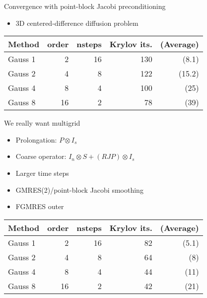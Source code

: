 \documentclass{beamer}
\begin{document}
\begin{frame}{Convergence with point-block Jacobi preconditioning}
  \begin{itemize}
  \item 3D centered-difference diffusion problem
  \end{itemize}
  \begin{tabular}{lrrrr}
    \toprule
    Method & order & nsteps & Krylov its. & (Average) \\
    \midrule
    Gauss 1 & 2 & 16 & 130 & (8.1) \\
    Gauss 2 & 4 & 8 & 122 & (15.2) \\
    Gauss 4 & 8 & 4 & 100 & (25) \\
    Gauss 8 & 16 & 2 & 78 & (39) \\
    \bottomrule
  \end{tabular}
\end{frame}

\begin{frame}{We really want multigrid}
  \begin{itemize}
  \item Prolongation: $P \otimes I_s$
  \item Coarse operator: $I_n \otimes S + (R J P) \otimes I_s$
  \item Larger time steps
  \item GMRES(2)/point-block Jacobi smoothing
  \item FGMRES outer
  \end{itemize}
  \begin{tabular}{lrrrr}
    \toprule
    Method & order & nsteps & Krylov its. & (Average) \\
    \midrule
    Gauss 1 & 2 & 16 & 82 & (5.1) \\
    Gauss 2 & 4 & 8 & 64 & (8) \\
    Gauss 4 & 8 & 4 & 44 & (11) \\
    Gauss 8 & 16 & 2 & 42 & (21) \\
    \bottomrule
  \end{tabular}
\end{frame}
\end{document}
